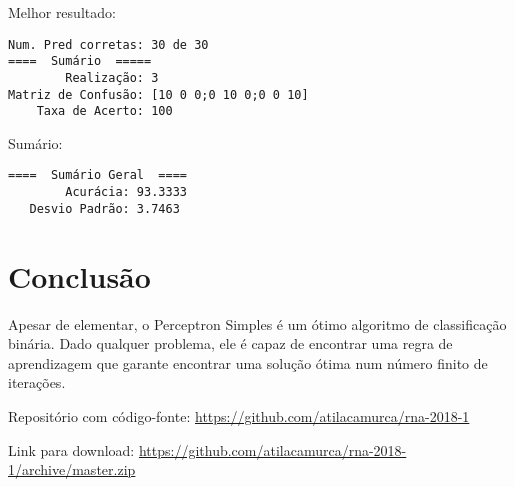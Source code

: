 Melhor resultado:

\begin{verbatim}
Num. Pred corretas: 30 de 30
====  Sumário  =====
        Realização: 3
Matriz de Confusão: [10 0 0;0 10 0;0 0 10]
    Taxa de Acerto: 100
\end{verbatim}

Sumário:

\begin{verbatim}
====  Sumário Geral  ====
        Acurácia: 93.3333
   Desvio Padrão: 3.7463
\end{verbatim}

\section{Conclusão}

Apesar de elementar, o Perceptron Simples é um ótimo algoritmo de
classificação binária. Dado qualquer problema, ele é capaz de encontrar
uma regra de aprendizagem que garante encontrar uma solução ótima num
número finito de iterações.

Repositório com código-fonte:
\url{https://github.com/atilacamurca/rna-2018-1}

Link para download:
\url{https://github.com/atilacamurca/rna-2018-1/archive/master.zip}
